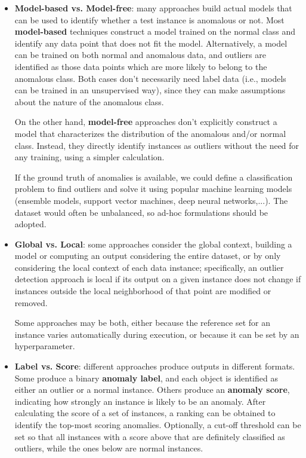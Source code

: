 \begin{itemize}
    \item \textbf{Model-based vs. Model-free}: many approaches build actual models that can be used to identify whether a test instance is anomalous or not. Most \textbf{model-based} techniques construct a model trained on the normal class and identify any data point that does not fit the model. Alternatively, a model can be trained on both normal and anomalous data, and outliers are identified as those data points which are more likely to belong to the anomalous class. Both cases don't necessarily need label data (i.e., models can be trained in an unsupervised way), since they can make assumptions about the nature of the anomalous class.

    On the other hand, \textbf{model-free} approaches don't explicitly construct a model that characterizes the distribution of the anomalous and/or normal class. Instead, they directly identify instances as outliers without the need for any training, using a simpler calculation.

    If the ground truth of anomalies is available, we could define a classification problem to find outliers and solve it using popular machine learning models (ensemble models, support vector machines, deep neural networks,...). The dataset would often be unbalanced, so ad-hoc formulations should be adopted.

    \item \textbf{Global vs. Local}: some approaches consider the global context, building a model or computing an output considering the entire dataset, or by only considering the local context of each data instance; specifically, an outlier detection approach is local if its output on a given instance does not change if instances outside the local neighborhood of that point are modified or removed.

    Some approaches may be both, either because the reference set for an instance varies automatically during execution, or because it can be set by an hyperparameter.

    \item \textbf{Label vs. Score}: different approaches produce outputs in different formats. Some produce a binary \textbf{anomaly label}, and each object is identified as either an outlier or a normal instance. Others produce an \textbf{anomaly score}, indicating how strongly an instance is likely to be an anomaly. After calculating the score of a set of instances, a ranking can be obtained to identify the top-most scoring anomalies. Optionally, a cut-off threshold can be set so that all instances with a score above that are definitely classified as outliers, while the ones below are normal instances.
\end{itemize}
